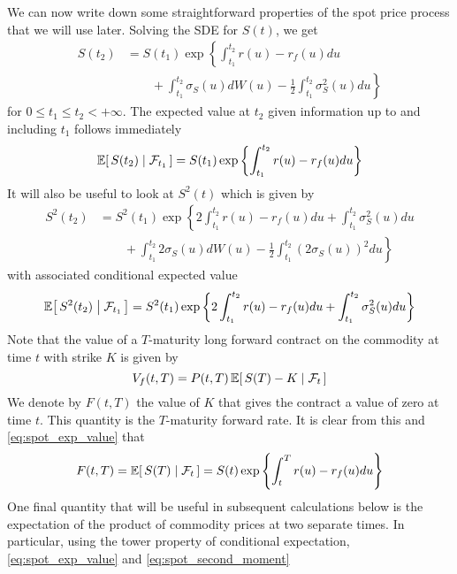 We can now write down some straightforward properties of the spot price process that we will use later. Solving the SDE for $S(t)$, we get
\begin{equation}
\begin{split}
S(t_2) &= S(t_1) \exp \left\{ \int_{t_1}^{t_2} r(u) - r_f(u) du \right. \\
       &\qquad + \left. \int_{t_1}^{t_2} \sigma_S(u) dW(u) - \frac{1}{2} \int_{t_1}^{t_2} \sigma^2_S(u) du \right\}
\end{split}
\end{equation}
for $0 \leq t_1 \leq t_2 < +\infty$. The expected value at $t_2$ given information up to and including $t_1$ follows immediately 
\begin{equation}
\CEx{S(t_2)}{\mathcal{F}_{t_1}} = S(t_1) \exp \left\{ \int_{t_1}^{t_2} r(u) - r_f(u) du \right\} \label{eq:spot_exp_value}
\end{equation}
It will also be useful to look at $S^2(t)$ which is given by
\begin{equation}
\begin{split}
S^2(t_2) &= S^2(t_1) \exp \left\{ 2 \int_{t_1}^{t_2} r(u) - r_f(u) du + \int_{t_1}^{t_2} \sigma^2_S(u) du \right. \\
         &\qquad + \left. \int_{t_1}^{t_2} 2 \sigma_S(u) dW(u) - \frac{1}{2} \int_{t_1}^{t_2} \left(2 \sigma_S(u) \right)^2 du \right\}
\end{split}
\end{equation}
with associated conditional expected value
\begin{equation}
\CEx{S^2(t_2)}{\mathcal{F}_{t_1}} = S^2(t_1) \exp \left\{ 2 \int_{t_1}^{t_2} r(u) - r_f(u) du + \int_{t_1}^{t_2} \sigma^2_S(u) du \right\} \label{eq:spot_second_moment}
\end{equation}
Note that the value of a $T$-maturity long forward contract on the commodity at time $t$ with strike $K$ is given by
\begin{equation}
V_f(t, T) = P(t, T) \CEx{S(T) - K}{\mathcal{F}_{t}} \label{eq:spot_forward_value}
\end{equation}
We denote by $F(t, T)$ the value of $K$ that gives the contract a value of zero at time $t$. This quantity is the $T$-maturity forward rate. It is clear from this and \eqref{eq:spot_exp_value} that
\begin{equation}
F(t, T) = \CEx{S(T)}{\mathcal{F}_{t}} = S(t) \exp \left\{ \int_{t}^{T} r(u) - r_f(u) du \right\} \label{eq:spot_forward_rate}
\end{equation}
One final quantity that will be useful in subsequent calculations below is the expectation of the product of commodity prices at two separate times. In particular, using the tower property of conditional expectation, \eqref{eq:spot_exp_value} and \eqref{eq:spot_second_moment}
